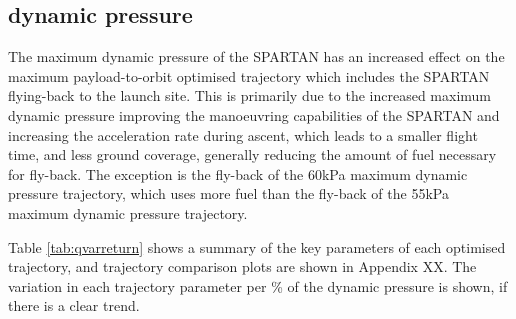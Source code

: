 \subsection{dynamic pressure}



The maximum dynamic pressure  of the SPARTAN has an increased effect on the maximum payload-to-orbit optimised trajectory which includes the SPARTAN flying-back to the launch site. This is primarily due to the increased maximum dynamic pressure improving the manoeuvring capabilities of the SPARTAN and increasing the acceleration rate during ascent, which leads to a smaller flight time, and less ground coverage, generally reducing the amount of fuel necessary for fly-back. The exception is the fly-back of the 60kPa maximum dynamic pressure trajectory, which uses more fuel than the fly-back of the 55kPa maximum dynamic pressure trajectory. 

Table \ref{tab:qvarreturn} shows a summary of the key parameters of each optimised trajectory, and trajectory comparison plots are shown in Appendix XX. The variation in each trajectory parameter per \% of the dynamic pressure is shown, if there is a clear trend. 



